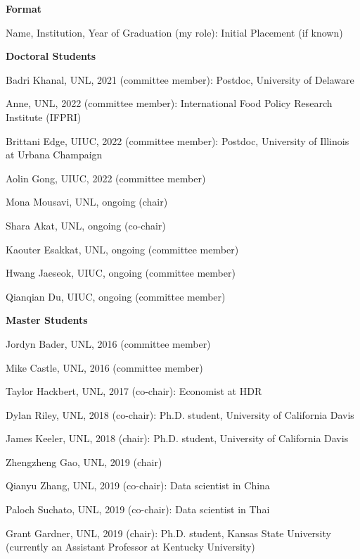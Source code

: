 \documentclass[10pt,margin,line]{res}
\newenvironment{list1}{
  \begin{list}{\ding{113}}{%
      \setlength{\itemsep}{0in}
      \setlength{\parsep}{0in} \setlength{\parskip}{0in}
      \setlength{\topsep}{0in} \setlength{\partopsep}{0in}
      \setlength{\leftmargin}{0.17in}}}{\end{list}}
\newenvironment{list2}{
  \begin{list}{-}{%
      \setlength{\itemsep}{0in}
      \setlength{\parsep}{0in} \setlength{\parskip}{0in}
      \setlength{\topsep}{0in} \setlength{\partopsep}{0in}
      \setlength{\leftmargin}{0.2in}}}{\end{list}}
\begin{document}
\begin{resume}
\begin{list1}
  \item[] \textbf{Format}
    \begin{list2}
      \item Name, Institution, Year of Graduation (my role): Initial Placement (if known)
    \end{list2}
  \item[] \textbf{Doctoral Students}
    \begin{list2}
    \item Badri Khanal, UNL, 2021 (committee member): Postdoc, University of Delaware
    \item Anne, UNL, 2022 (committee member): International Food Policy Research Institute (IFPRI)
    \item Brittani Edge, UIUC, 2022 (committee member): Postdoc, University of Illinois at Urbana Champaign
    \item Aolin Gong, UIUC, 2022 (committee member)
    \item Mona Mousavi, UNL, ongoing (chair) 
    \item Shara Akat, UNL, ongoing (co-chair) 
    \item Kaouter Esakkat, UNL, ongoing (committee member)
    \item Hwang Jaeseok, UIUC, ongoing (committee member)
    \item Qianqian Du, UIUC, ongoing (committee member)
    \end{list2}
  \item[] \textbf{Master Students}
  \begin{list2}
    \item Jordyn Bader, UNL, 2016 (committee member)
    \item Mike Castle, UNL, 2016 (committee member)
    \item Taylor Hackbert, UNL, 2017 (co-chair): Economist at HDR
    \item Dylan Riley, UNL, 2018 (co-chair): Ph.D. student, University of California Davis
    \item James Keeler, UNL, 2018 (chair): Ph.D. student, University of California Davis
    \item Zhengzheng Gao, UNL, 2019 (chair)
    \item Qianyu Zhang, UNL, 2019 (co-chair): Data scientist in China
    \item Paloch Suchato, UNL, 2019 (co-chair): Data scientist in Thai 
    \item Grant Gardner, UNL, 2019 (chair): Ph.D. student, Kansas State University (currently an Assistant Professor at Kentucky University)

\end{list2}
\end{list1}
\end{resume}
\end{document}
